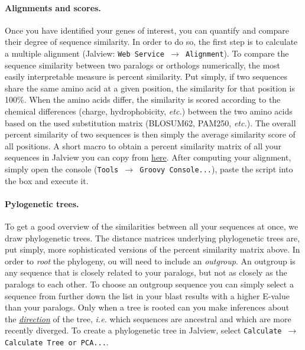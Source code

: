 \documentclass[11pt]{article}
\begin{document}
	\paragraph*{Alignments and scores.} Once you have identified your genes of interest, you can quantify and compare their degree of sequence similarity.
	In order to do so, the first step is to calculate a multiple alignment (Jalview: \texttt{Web Service $\rightarrow$ Alignment}).
	To compare the sequence similarity between two paralogs or orthologs numerically, the most easily interpretable measure is percent similarity. 
	Put simply, if two sequences share the same amino acid at a given position, the similarity for that position is 100\%. 
	When the amino acids differ, the similarity is scored according to the chemical differences (charge, hydrophobicity, \textit{etc.}) between the two amino acids based on the used substitution matrix (BLOSUM62, PAM250, \textit{etc.}). 
	The overall percent similarity of two sequences is then simply the average similarity score of all positions. 
	A short macro to obtain a percent similarity matrix of all your sequences in Jalview you can copy from \href{https://github.com/leonardblaschek/teaching/blob/master/bioinformatics/jalview_simmat.txt}{here}. 
	After computing your alignment, simply open the console (\texttt{Tools $\rightarrow$ Groovy Console...}), paste the script into the box and execute it.
	
	\paragraph*{Pylogenetic trees.}To get a good overview of the similarities between all your sequences at once, we draw phylogenetic trees. The distance matrices underlying phylogenetic trees are, put simply, more sophisticated versions of the percent similarity matrix above. In order to \textit{root} the phylogeny, ou will need to include an \textit{outgroup}. An outgroup is any sequence that is closely related to your paralogs, but not as closely as the paralogs to each other. To choose an outgroup sequence you can simply select a sequence from further down the list in your blast results with a higher E-value than your paralogs. Only when a tree is rooted can you make inferences about the \href{https://evolution.berkeley.edu/evolibrary/article/evo_05}{\textit{direction}} of the tree, \textit{i.e.} which sequences are ancestral and which are more recently diverged. To create a phylogenetic tree in Jalview, select \texttt{Calculate $\rightarrow$ Calculate Tree or PCA...}.
	
\end{document}
